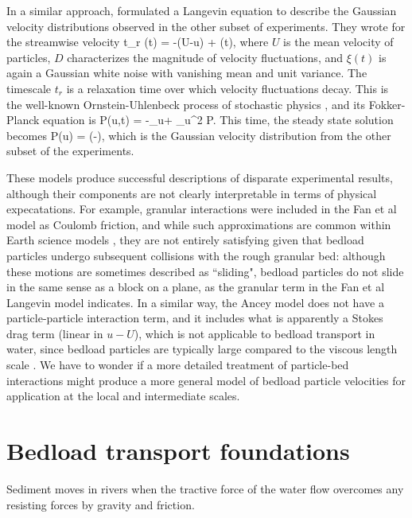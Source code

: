 In a similar approach, \citet{Ancey2014} formulated a Langevin equation to describe the Gaussian velocity distributions observed in the other subset of experiments. They wrote for the streamwise velocity 
\be t_r (t) = -(U-u) + \xi(t),\ee
where $U$ is the mean velocity of particles, $D$ characterizes the magnitude of velocity fluctuations, and $\xi(t)$ is again a Gaussian white noise with vanishing mean and unit variance. The timescale $t_r$ is a relaxation time over which velocity fluctuations decay. This is the well-known Ornstein-Uhlenbeck process of stochastic physics \citep{Gardiner1983}, and its Fokker-Planck equation is
\be \pt P(u,t) = -\partial_u +  \partial_u^2 P.\ee
This time, the steady state solution becomes
\be P(u) =  \exp\Big(-\Big), \ee
which is the Gaussian velocity distribution from the other subset of the experiments.

These models produce successful descriptions of disparate experimental results, although their components are not clearly interpretable in terms of physical expecatations. For example, granular interactions were included in the Fan et al model as Coulomb friction, and while such approximations are common within Earth science models \citep{Kirkby1971}, they are not entirely satisfying given that bedload particles undergo subsequent collisions with the rough granular bed: although these motions are sometimes described as ``sliding", bedload particles do not slide in the same sense as a block on a plane, as the granular term in the Fan et al Langevin model indicates.
In a similar way, the Ancey model does not have a particle-particle interaction term, and it includes what is apparently a Stokes drag term (linear in $u-U$), which is not applicable to bedload transport in water, since bedload particles are typically large compared to the viscous length scale \citep{CLift1978}.
We have to wonder if a more detailed treatment of particle-bed interactions might produce a more general model of bedload particle velocities for application at the local and intermediate scales.

\section{Bedload transport foundations}

Sediment moves in rivers when the tractive force of the water flow overcomes any resisting forces by gravity and friction. 

